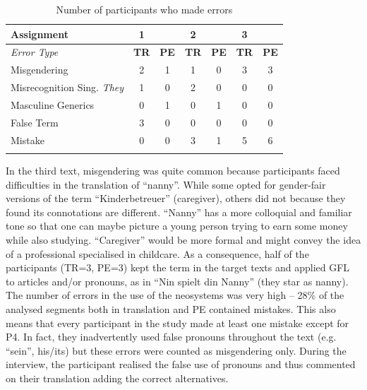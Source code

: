 \begin{table}[!ht]
    \centering
    \caption{Number of participants who made errors}
    \begin{tabular}{lcccccc} \lsptoprule
      \textbf{Assignment}       & 1              &                & 2              &                & 3           &              \\
\midrule
       \textit{Error Type}      & \textbf{TR}    & \textbf{PE}    & \textbf{TR}    & \textbf{PE}    & \textbf{TR} & \textbf{PE} \\
      Misgendering              & 2              & 1              & 1              & 0              & 3           & 3           \\
      Misrecognition Sing. \textit{They} & 1              & 0              & 2              & 0              & 0           &  0          \\
      Masculine Generics             & 0              & 1              & 0              & 1              & 0           &    0       \\
      False Term                & 3              & 0              & 0              & 0              & 0           & 0          \\
      Mistake                   & 0              & 0              & 3              & 1              & 5          & 6          \\
\lspbottomrule

    \end{tabular}
    \label{tab:error2}
\end{table}

In the third text, misgendering was quite common because participants faced difficulties in the translation of ``nanny''. While some opted for gender-fair versions of the term ``Kinderbetreuer'' (caregiver), others did not because they found its connotations are different. ``Nanny'' has a more colloquial and familiar tone so that one can maybe picture a young person trying to earn some money while also studying. ``Caregiver'' would be more formal and might convey the idea of a professional specialised in childcare. As a consequence, half of the participants (TR=3, PE=3) kept the term in the target texts and applied GFL to articles and/or pronouns, as in ``Nin spielt din Nanny'' (they star as nanny). The number of errors in the use of the neosystems was very high -- 28\% of the analysed segments both in translation and PE contained mistakes. This also means that every participant in the study made at least one mistake except for P4. In fact, they inadvertently used false pronouns throughout the text (e.g. ``sein'', his/its) but these errors were counted as misgendering only. During the interview, the participant realised the false use of pronouns and thus commented on their translation adding the correct alternatives.

